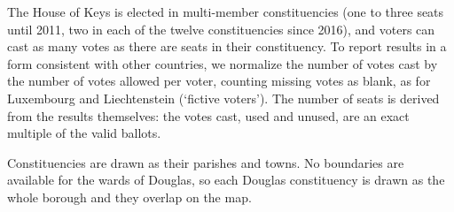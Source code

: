 The House of Keys is elected in multi-member constituencies (one to three
seats until 2011, two in each of the twelve constituencies since 2016), and
voters can cast as many votes as there are seats in their constituency.  To
report results in a form consistent with other countries, we normalize the
number of votes cast by the number of votes allowed per voter, counting
missing votes as blank, as for Luxembourg and Liechtenstein (`fictive
voters').  The number of seats is derived from the results themselves: the
votes cast, used and unused, are an exact multiple of the valid ballots.

Constituencies are drawn as their parishes and towns.  No boundaries are
available for the wards of Douglas, so each Douglas constituency is drawn as
the whole borough and they overlap on the map.
